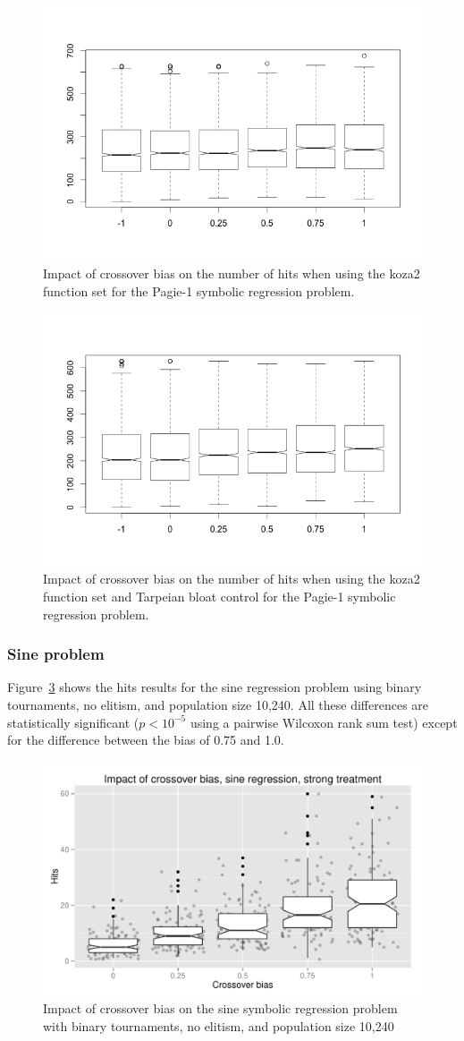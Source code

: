 \documentclass{sig-alternate}
\begin{document}
\begin{figure}
\centering
\includegraphics[width=0.45 \textwidth]{Plots/Pagie-1-koza2_no_Tarpeian.png}
\caption{Impact of crossover bias on the number of hits when using the koza2 function set for the Pagie-1 
symbolic regression problem.}
\label{fig:Pagie1Koza2}
\end{figure}

\begin{figure}
\centering
\includegraphics[width=0.45 \textwidth]{Plots/Pagie-1-tarp.png}
\caption{Impact of crossover bias on the number of hits when using the koza2 function set and Tarpeian bloat 
control for the Pagie-1 symbolic regression problem.}
\label{fig:Pagie1Koza2Tarpeian}
\end{figure}

\subsubsection{Sine problem}

Figure~\ref{fig:sineBiasResultsStrong} shows the hits results for the sine regression problem using binary tournaments, no 
elitism, and population size 10,240. All these differences are statistically significant ($p < 10^{-5}$ using a 
pairwise Wilcoxon rank sum test) except for the difference between the bias of 0.75 and 1.0.

\begin{figure}
\centering
\includegraphics[width=0.45 \textwidth]{Plots/Sine_XO_impact_strong_boxplot.pdf}
\caption{Impact of crossover bias on the sine symbolic regression problem with binary tournaments, no elitism, and 
population size 10,240}
\label{fig:sineBiasResultsStrong}
\end{figure}
\end{document}
